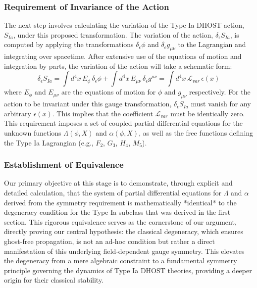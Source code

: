 \documentclass[twocolumn]{aastex631}
\begin{document}
\subsubsection*{Requirement of Invariance of the Action}
The next step involves calculating the variation of the Type Ia DHOST action, $S_{Ia}$, under this proposed transformation. The variation of the action, $\delta_\epsilon S_{Ia}$, is computed by applying the transformations $\delta_\epsilon \phi$ and $\delta_\epsilon g_{\mu\nu}$ to the Lagrangian and integrating over spacetime. After extensive use of the equations of motion and integration by parts, the variation of the action will take a schematic form:
$$\delta_\epsilon S_{Ia} = \int d^4x \, E_{\phi} \, \delta_\epsilon \phi + \int d^4x \, E_{\mu\nu} \, \delta_\epsilon g^{\mu\nu} = \int d^4x \, \mathcal{L}_{var} \, \epsilon(x)$$
where $E_{\phi}$ and $E_{\mu\nu}$ are the equations of motion for $\phi$ and $g_{\mu\nu}$ respectively. For the action to be invariant under this gauge transformation, $\delta_\epsilon S_{Ia}$ must vanish for any arbitrary $\epsilon(x)$. This implies that the coefficient $\mathcal{L}_{var}$ must be identically zero. This requirement imposes a set of coupled partial differential equations for the unknown functions $\Lambda(\phi, X)$ and $\alpha(\phi, X)$, as well as the free functions defining the Type Ia Lagrangian (e.g., $F_2$, $G_3$, $H_4$, $M_5$).

\subsubsection*{Establishment of Equivalence}
Our primary objective at this stage is to demonstrate, through explicit and detailed calculation, that the system of partial differential equations for $\Lambda$ and $\alpha$ derived from the symmetry requirement is mathematically *identical* to the degeneracy condition for the Type Ia subclass that was derived in the first section. This rigorous equivalence serves as the cornerstone of our argument, directly proving our central hypothesis: the classical degeneracy, which ensures ghost-free propagation, is not an ad-hoc condition but rather a direct manifestation of this underlying field-dependent gauge symmetry. This elevates the degeneracy from a mere algebraic constraint to a fundamental symmetry principle governing the dynamics of Type Ia DHOST theories, providing a deeper origin for their classical stability.
\end{document}
